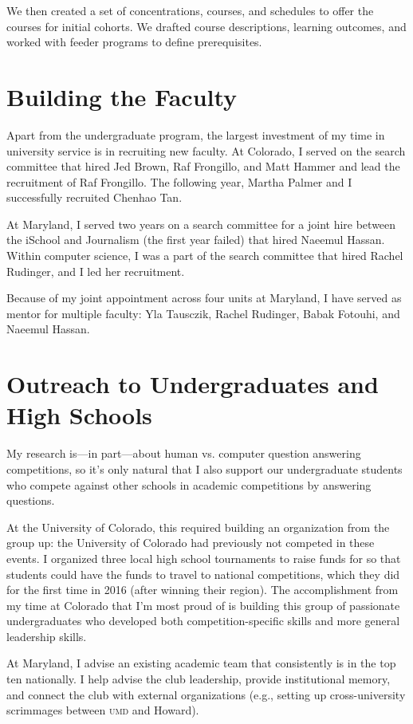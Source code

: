 \documentclass[11pt]{amsart}
\newcommand{\abr}[1]{\textsc{#1}}
\begin{document}
We then created a set of concentrations, courses, and schedules to
offer the courses for initial cohorts.  We drafted course
descriptions, learning outcomes, and worked with feeder programs to
define prerequisites.

\section{Building the Faculty}

Apart from the undergraduate program, the largest investment of my
time in university service is in recruiting new faculty.
%
At Colorado, I served on the search committee that 
hired Jed Brown, Raf Frongillo, and Matt Hammer and lead the
recruitment of Raf Frongillo.
%
The following year, Martha Palmer and I successfully recruited Chenhao
Tan.

At Maryland, I served two years on a search committee for a joint hire
between the iSchool and Journalism (the first year failed) that hired
Naeemul Hassan.
%
Within computer science, I was a part of the search committee that
hired Rachel Rudinger, and I led her recruitment.

Because of my joint appointment across four units at Maryland, I have
served as mentor for multiple faculty: Yla Tausczik, Rachel Rudinger,
Babak Fotouhi, and Naeemul Hassan.


\section{Outreach to Undergraduates and High Schools}


My research is---in part---about human vs. computer question answering
competitions, so it's only natural that I also support our
undergraduate students who compete against other schools in academic
competitions by answering questions.

At the University of Colorado, this required building an organization
from the group up: the University of Colorado had previously not
competed in these events.
%
I organized three local high school tournaments to raise funds for so that
students could have the funds to travel to national competitions, which
they did for the first time in 2016 (after winning their region).
%
The accomplishment from my time at Colorado that I'm most proud of is
building this group of passionate undergraduates who developed both
competition-specific skills and more general leadership skills.

At Maryland, I advise an existing academic team that
consistently is in the top ten nationally.
%
I help advise the club leadership, provide institutional memory, and
connect the club with external organizations (e.g., setting up
cross-university scrimmages between \abr{umd} and Howard).


%
%
\end{document}
